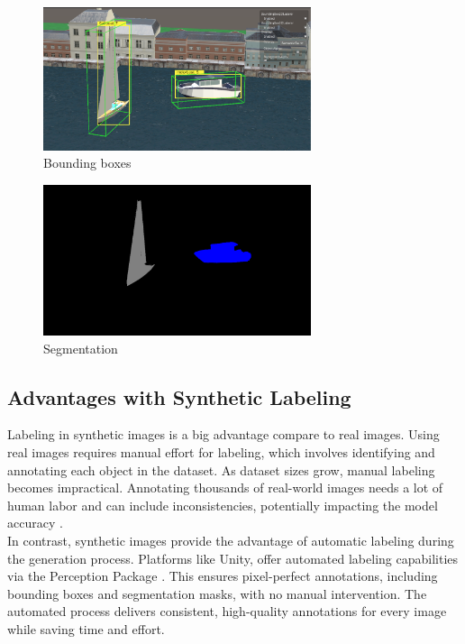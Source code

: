\begin{figure}[H]
    \centering
    \includegraphics[width=0.7\textwidth]{Figures/boundingbox.png}
    \caption{Bounding boxes}
    \label{fig:image2}
\end{figure}

\begin{figure}[H]
    \centering
    \includegraphics[width=0.7\textwidth]{Figures/segmentation_2.png}
    \caption{Segmentation}
    \label{fig:image3}
\end{figure}




\subsection{Advantages with Synthetic Labeling}
Labeling in synthetic images is a big advantage compare to real images. Using real images requires manual effort for labeling, which involves identifying and annotating each object in the dataset. As dataset sizes grow, manual labeling becomes impractical. Annotating thousands of real-world images needs a lot of human labor and can include inconsistencies, potentially impacting the model accuracy \cite{nikolenko2021synthetic}.\\

\noindent In contrast, synthetic images provide the advantage of automatic labeling during the generation process. Platforms like Unity, offer automated labeling capabilities via the Perception Package \cite{unity-perception2022}. This ensures pixel-perfect annotations, including bounding boxes and segmentation masks, with no manual intervention. The automated process delivers consistent, high-quality annotations for every image while saving time and effort.


